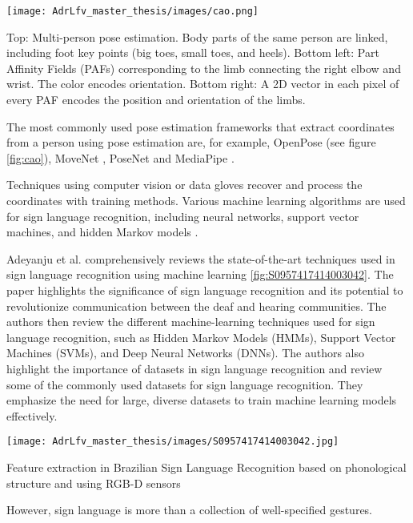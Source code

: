 \begin{marginfigure}
    \centering
    \texttt{[image: AdrLfv\_master\_thesis/images/cao.png]}
    \caption{Top: Multi-person pose estimation. Body parts of the same person are linked, including foot key points (big toes, small toes, and heels). Bottom left: Part Affinity Fields (PAFs) corresponding to the limb connecting the right elbow and wrist. The color encodes orientation. Bottom right: A 2D vector in each pixel of every PAF encodes the position and orientation of the limbs.}
    \label{fig:cao}
\end{marginfigure}

The most commonly used pose estimation frameworks that extract coordinates from a person using pose estimation are, for example, OpenPose \cite{cao2017realtime} (see figure \ref{fig:cao}), MoveNet \cite{movenet}, PoseNet \cite{kendall2015posenet} and MediaPipe \cite{lugaresi2019mediapipe}.



Techniques using computer vision or data gloves recover and process the coordinates with training methods. Various machine learning algorithms are used for sign language recognition, including neural networks, support vector machines, and hidden Markov models \cite{9178440}.

Adeyanju et al. comprehensively reviews the state-of-the-art techniques used in sign language recognition using machine learning \cite{almeida2014feature} \ref{fig:S0957417414003042}. The paper highlights the significance of sign language recognition and its potential to revolutionize communication between the deaf and hearing communities. The authors then review the different machine-learning techniques used for sign language recognition, such as Hidden Markov Models (HMMs), Support Vector Machines (SVMs), and Deep Neural Networks (DNNs).
The authors also highlight the importance of datasets in sign language recognition and review some of the commonly used datasets for sign language recognition. They emphasize the need for large, diverse datasets to train machine learning models effectively.

\begin{marginfigure}
    \centering
    \texttt{[image: AdrLfv\_master\_thesis/images/S0957417414003042.jpg]}
    \caption{Feature extraction in Brazilian Sign Language Recognition based on phonological structure and using RGB-D sensors}
    \label{fig:S0957417414003042}
\end{marginfigure}

However, sign language is more than a collection of well-specified gestures.

